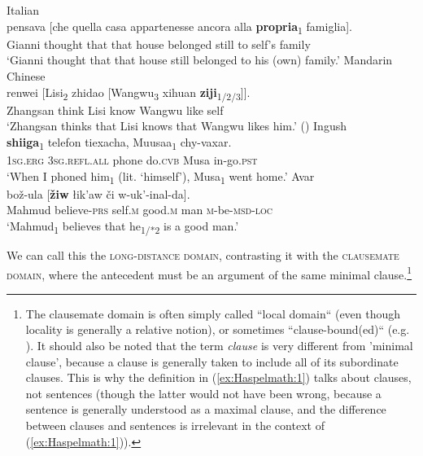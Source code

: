 \documentclass[output=paper]{langscibook}
\begin{document}
\ea%
    \label{ex:Haspelmath:44}
    \ea  Italian \label{ex:Haspelmath:44a} \\
      {pensava}  [{che}  {quella}  {casa}    {appartenesse}  {ancora}  {alla}  \textbf{{propria}}{\textsubscript{1} } {famiglia}].\\
       Gianni  thought  that  that  house  belonged  still    to  self’s    family  \\
    \glt  ‘Gianni thought that that house still belonged to his (own) family.’  \citep[314]{Giorgi1984}
    \ex    Mandarin Chinese \label{ex:Haspelmath:44b}\\
      {renwei}  [{Lisi\textsubscript{2}}  {zhidao}  [{Wangwu\textsubscript{3}}  {xihuan}  \textbf{{ziji}}{\textsubscript{1/2/3}}]].\\
        Zhangsan  think  Lisi  know  Wangwu  like  self \\
    \glt ‘Zhangsan thinks that Lisi knows that Wangwu likes him.’ (\citealt[22]{Cole2006})
    \ex  Ingush\\
      \textbf{{shiiga}}{\textsubscript{1}}  {telefon}  {tiexacha,}  {Muusaa\textsubscript{1}}  {chy-vaxar.}\\
       \textsc{1sg.erg}  \textsc{3sg.refl.all}  phone  do.\textsc{cvb}  Musa  in-go.\textsc{pst} \\
    \glt‘When I phoned him\textsubscript{1} (lit. ‘himself’), Musa\textsubscript{1} went home.’ \citep[645]{Nichols2011}
    \ex  Avar \label{ex:Haspelmath:44c}\\
      {bož-ula}  [\textbf{{žiw}}  {łik’aw}  {či}  {w-uk’-inal-da}].\\
      Mahmud  believe-\textsc{prs}  self.\textsc{m}  good.\textsc{m}  man  \textsc{m}{}-be-\textsc{msd}{}-\textsc{loc}  \\
    \glt ‘Mahmud\textsubscript{1} believes that he\textsubscript{1/*2} is a good man.’ \citep[155]{Rudnev2017} 
    \z
\z


We can call this the \textsc{long-distance} \textsc{domain}, contrasting it with the \textsc{clausemate} \textsc{domain,} where the antecedent must be an argument of the same minimal clause.\footnote{ {The clausemate domain is often simply called “local domain“ (even though locality is generally a relative notion), or sometimes “clause-bound(ed)“ (e.g. \citealt[393]{Vanvalin1997}). It should also be noted that the term} {\textit{clause}} {is very different from ’minimal clause’, because a clause is generally taken to include all of its subordinate clauses. This is why the definition in (\ref{ex:Haspelmath:1}) talks about clauses, not sentences (though the latter would not have been wrong, because a sentence is generally understood as a maximal clause, and the difference between clauses and sentences is irrelevant in the context of (\ref{ex:Haspelmath:1})).} }
\end{document}
